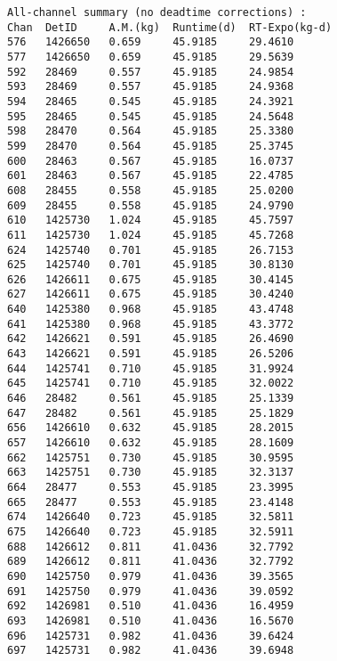 \documentclass[notitlepage,rmp,aps,10pt]{revtex4-1}
\begin{document}
\begin{verbatim}
All-channel summary (no deadtime corrections) :
Chan  DetID     A.M.(kg)  Runtime(d)  RT-Expo(kg-d)
576   1426650   0.659     45.9185     29.4610
577   1426650   0.659     45.9185     29.5639
592   28469     0.557     45.9185     24.9854
593   28469     0.557     45.9185     24.9368
594   28465     0.545     45.9185     24.3921
595   28465     0.545     45.9185     24.5648
598   28470     0.564     45.9185     25.3380
599   28470     0.564     45.9185     25.3745
600   28463     0.567     45.9185     16.0737
601   28463     0.567     45.9185     22.4785
608   28455     0.558     45.9185     25.0200
609   28455     0.558     45.9185     24.9790
610   1425730   1.024     45.9185     45.7597
611   1425730   1.024     45.9185     45.7268
624   1425740   0.701     45.9185     26.7153
625   1425740   0.701     45.9185     30.8130
626   1426611   0.675     45.9185     30.4145
627   1426611   0.675     45.9185     30.4240
640   1425380   0.968     45.9185     43.4748
641   1425380   0.968     45.9185     43.3772
642   1426621   0.591     45.9185     26.4690
643   1426621   0.591     45.9185     26.5206
644   1425741   0.710     45.9185     31.9924
645   1425741   0.710     45.9185     32.0022
646   28482     0.561     45.9185     25.1339
647   28482     0.561     45.9185     25.1829
656   1426610   0.632     45.9185     28.2015
657   1426610   0.632     45.9185     28.1609
662   1425751   0.730     45.9185     30.9595
663   1425751   0.730     45.9185     32.3137
664   28477     0.553     45.9185     23.3995
665   28477     0.553     45.9185     23.4148
674   1426640   0.723     45.9185     32.5811
675   1426640   0.723     45.9185     32.5911
688   1426612   0.811     41.0436     32.7792
689   1426612   0.811     41.0436     32.7792
690   1425750   0.979     41.0436     39.3565
691   1425750   0.979     41.0436     39.0592
692   1426981   0.510     41.0436     16.4959
693   1426981   0.510     41.0436     16.5670
696   1425731   0.982     41.0436     39.6424
697   1425731   0.982     41.0436     39.6948
\end{verbatim}
\end{document}
